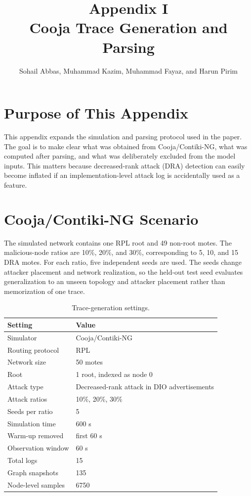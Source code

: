 \documentclass[10pt]{article}
\title{\vspace{-1.2cm}Appendix I\\Cooja Trace Generation and Parsing}
\author{Sohail Abbas, Muhammad Kazim, Muhammad Fayaz, and Harun Pirim}
\date{}
\begin{document}
\maketitle

\section{Purpose of This Appendix}
This appendix expands the simulation and parsing protocol used in the paper. The goal is to make clear what was obtained from Cooja/Contiki-NG, what was computed after parsing, and what was deliberately excluded from the model inputs. This matters because decreased-rank attack (DRA) detection can easily become inflated if an implementation-level attack log is accidentally used as a feature.

\section{Cooja/Contiki-NG Scenario}
The simulated network contains one RPL root and 49 non-root motes. The malicious-node ratios are 10\%, 20\%, and 30\%, corresponding to 5, 10, and 15 DRA motes. For each ratio, five independent seeds are used. The seeds change attacker placement and network realization, so the held-out test seed evaluates generalization to an unseen topology and attacker placement rather than memorization of one trace.

\begin{table}[h]
\centering
\caption{Trace-generation settings.}
\small
\begin{tabular}{ll}
\toprule
Setting & Value\\
\midrule
Simulator & Cooja/Contiki-NG\\
Routing protocol & RPL\\
Network size & 50 motes\\
Root & 1 root, indexed as node 0\\
Attack type & Decreased-rank attack in DIO advertisements\\
Attack ratios & 10\%, 20\%, 30\%\\
Seeds per ratio & 5\\
Simulation time & 600 s\\
Warm-up removed & first 60 s\\
Observation window & 60 s\\
Total logs & 15\\
Graph snapshots & 135\\
Node-level samples & 6750\\
\bottomrule
\end{tabular}
\end{table}
\end{document}

